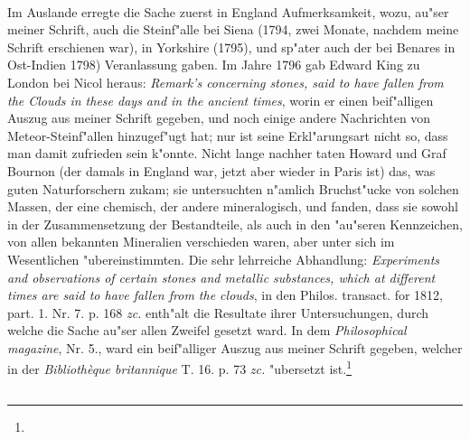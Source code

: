 \documentclass[a4paper, 11pt, oneside, polutonikogreek, german]{article}
\begin{document}
\paragraph{}
Im Auslande erregte die Sache zuerst in England Aufmerksamkeit, wozu, au"ser meiner Schrift, auch die Steinf"alle bei Siena (1794, zwei Monate, nachdem meine Schrift erschienen war), in Yorkshire (1795), und sp"ater auch der bei Benares in Ost-Indien 1798) Veranlassung gaben. Im Jahre 1796 gab Edward King zu London bei Nicol heraus: \emph{Remark's concerning stones, said to have fallen from the Clouds in these days and in the ancient times}, worin er einen beif"alligen Auszug aus meiner Schrift gegeben, und noch einige andere Nachrichten von Meteor-Steinf"allen hinzugef"ugt hat; nur ist seine Erkl"arungsart nicht so, dass man damit zufrieden sein k"onnte. Nicht lange nachher taten Howard und Graf Bournon (der damals in England war, jetzt aber wieder in Paris ist) das, was guten Naturforschern zukam; sie untersuchten n"amlich Bruchst"ucke von solchen Massen, der eine chemisch, der andere mineralogisch, und fanden, dass sie sowohl in der Zusammensetzung der Bestandteile, als auch in den "au"seren Kennzeichen, von allen bekannten Mineralien verschieden waren, aber unter sich im Wesentlichen "ubereinstimmten. Die sehr lehrreiche Abhandlung: \emph{Experiments and observations of certain stones and metallic substances, which at different times are said to have fallen from the clouds}, in den Philos. transact. for 1812, part. 1. Nr. 7. p. 168 \emph{zc.} enth"alt die Resultate ihrer Untersuchungen, durch welche die Sache au"ser allen Zweifel gesetzt ward. In dem \emph{Philosophical magazine}, Nr. 5., ward ein beif"alliger Auszug aus meiner Schrift gegeben, welcher in der \emph{Bibliothèque britannique} T. 16. p. 73 \emph{zc.} "ubersetzt ist.\footnote{}
\subsection{}
\end{document}
